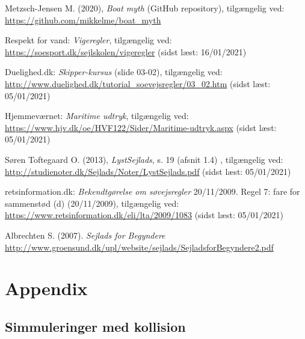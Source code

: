 \documentclass[%
 reprint,
nofootinbib,
aps,
]{revtex4-1}
\begin{document}
\begin{thebibliography}{9}
   Metzsch-Jensen M. (2020), \textit{Boat myth} (GitHub repository), tilgængelig ved: \url{https://github.com/mikkelme/boat_myth}

   Respekt for vand: \textit{Vigeregler}, tilgængelig ved: \url{https://soesport.dk/sejlskolen/vigeregler} (sidst læst: 16/01/2021)

   Duelighed.dk: \textit{Skipper-kursus} (slide 03-02), tilgængelig ved: \url{http://www.duelighed.dk/tutorial_soevejsregler/03_02.htm} (sidst læst: 05/01/2021)

   Hjemmeværnet: \textit{Maritime udtryk}, tilgængelig ved: \url{https://www.hjv.dk/oe/HVF122/Sider/Maritime-udtryk.aspx} (sidst læst: 05/01/2021)

   Søren Toftegaard O. (2013), \textit{LystSejlads}, s. 19 (afsnit 1.4) , tilgængelig ved: \url{http://studienoter.dk/Sejlads/Noter/LystSejlads.pdf} (sidst læst: 05/01/2021)

  \pagebreak
   retsinformation.dk: \textit{Bekendtgørelse om søvejsregler} 20/11/2009. Regel 7: fare for sammenstød (d) (20/11/2009), tilgængelig ved: \url{https://www.retsinformation.dk/eli/lta/2009/1083} (sidst læst: 05/01/2021)

   Albrechten S. (2007). \textit{Sejlads for Begyndere} \url{http://www.groensund.dk/upl/website/sejlads/SejladsforBegyndere2.pdf}


\end{thebibliography}

\clearpage
\onecolumngrid
\section{Appendix}\label{sec:appendix}

\subsection{Simmuleringer med kollision}
\end{document}
